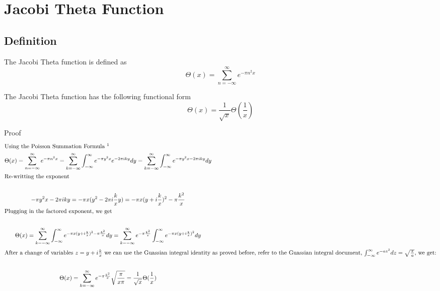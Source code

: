 \documentclass[a4paper]{article}
\begin{document}
\section{Jacobi Theta Function}

\subsection{Definition}
\begin{definition}\label{Jacobi Theta def}
The Jacobi Theta function is defined as 
$$
\Theta(x) = \sum_{n=-\infty}^{\infty} e^{- \pi n^2 x}
$$
\end{definition}

\begin{theorem}
The Jacobi Theta function has the following functional form
\begin{equation} \label{Jacobi functional form}
\Theta(x) = \frac{1}{\sqrt{x}} \Theta(\frac{1}{x})
\end{equation}

Proof
\begin{gather*}
\intertext{Using the Poisson Summation Formula \footnotemark}
\Theta(x) = \sum_{n=-\infty}^{\infty} e^{- \pi n^2 x} = \sum_{k=-\infty}^{\infty} 
\int_{-\infty}^{\infty}
e^{- \pi y^2 x} e^{-2 \pi i k y} dy 
=
\sum_{k=-\infty}^{\infty} 
\int_{-\infty}^{\infty}
e^{- \pi y^2 x -2 \pi i k y} dy 
\\
\intertext{Re-writting the exponent}
\\ 
- \pi y^2 x -2 \pi i k y 
= - \pi x (y^2 -2 \pi i \frac{k}{x} y)
= - \pi x (y + i \frac{k}{x})^2 - \pi \frac{k^2}{x}
\\
\intertext{Plugging in the factored exponent, we get}
\\
\Theta(x) 
=
\sum_{k=-\infty}^{\infty} 
\int_{-\infty}^{\infty}
e^{- \pi x (y + i \frac{k}{x})^2 - \pi \frac{k^2}{x}} dy 
=
\sum_{k=-\infty}^{\infty}
e^{- \pi \frac{k^2}{x}} 
\int_{-\infty}^{\infty}
e^{- \pi x (y + i \frac{k}{x})^2} dy
\\
\intertext{After a change of variables $z = y + i \frac{k}{x}$ we can use the Guassian integral identity as proved before, refer to the Guassian integral document, $\int_{-\infty}^{\infty}
e^{- a z^2 } dz = \sqrt{\frac{\pi}{a}} $, we get:}
\\ 
\Theta(x) 
=
\sum_{k=-\infty}^{\infty}
e^{- \pi \frac{k^2}{x}} 
\sqrt{\frac{\pi}{x \pi}}
= \frac{1}{\sqrt{x}} \Theta(\frac{1}{x}) 
\end{gather*}
\end{theorem}
\end{document}
